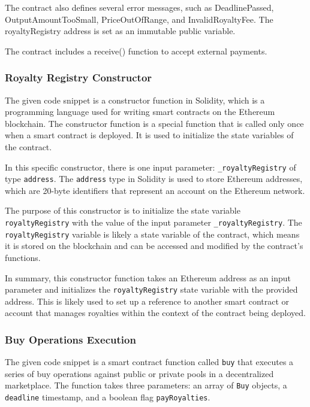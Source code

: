The contract also defines several error messages, such as
DeadlinePassed, OutputAmountTooSmall, PriceOutOfRange, and
InvalidRoyaltyFee. The royaltyRegistry address is set as an immutable
public variable.

The contract includes a receive() function to accept external payments.

\hypertarget{royalty-registry-constructor}{%
\subsubsection{Royalty Registry
Constructor}\label{royalty-registry-constructor}}

The given code snippet is a constructor function in Solidity, which is a
programming language used for writing smart contracts on the Ethereum
blockchain. The constructor function is a special function that is
called only once when a smart contract is deployed. It is used to
initialize the state variables of the contract.

In this specific constructor, there is one input parameter:
\texttt{\_royaltyRegistry} of type \texttt{address}. The
\texttt{address} type in Solidity is used to store Ethereum addresses,
which are 20-byte identifiers that represent an account on the Ethereum
network.

The purpose of this constructor is to initialize the state variable
\texttt{royaltyRegistry} with the value of the input parameter
\texttt{\_royaltyRegistry}. The \texttt{royaltyRegistry} variable is
likely a state variable of the contract, which means it is stored on the
blockchain and can be accessed and modified by the contract's functions.

In summary, this constructor function takes an Ethereum address as an
input parameter and initializes the \texttt{royaltyRegistry} state
variable with the provided address. This is likely used to set up a
reference to another smart contract or account that manages royalties
within the context of the contract being deployed.

\hypertarget{buy-operations-execution}{%
\subsubsection{Buy Operations
Execution}\label{buy-operations-execution}}

The given code snippet is a smart contract function called \texttt{buy}
that executes a series of buy operations against public or private pools
in a decentralized marketplace. The function takes three parameters: an
array of \texttt{Buy} objects, a \texttt{deadline} timestamp, and a
boolean flag \texttt{payRoyalties}.

